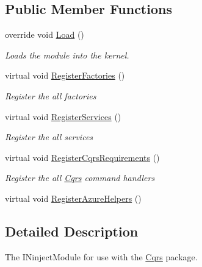 \subsection*{Public Member Functions}
\begin{DoxyCompactItemize}
\item 
override void \hyperlink{classCqrs_1_1Ninject_1_1Azure_1_1DocumentDb_1_1Configuration_1_1TestAzureDocumentDbModule_a88bb55534346355d3cf206a3bc8fa9c5}{Load} ()
\begin{DoxyCompactList}\small\item\em Loads the module into the kernel. \end{DoxyCompactList}\item 
virtual void \hyperlink{classCqrs_1_1Ninject_1_1Azure_1_1DocumentDb_1_1Configuration_1_1TestAzureDocumentDbModule_a903d7c2fc23d846f14024a8b83dd4a8f}{Register\+Factories} ()
\begin{DoxyCompactList}\small\item\em Register the all factories \end{DoxyCompactList}\item 
virtual void \hyperlink{classCqrs_1_1Ninject_1_1Azure_1_1DocumentDb_1_1Configuration_1_1TestAzureDocumentDbModule_aff24a0011b81f9db1a0509f712b791a4}{Register\+Services} ()
\begin{DoxyCompactList}\small\item\em Register the all services \end{DoxyCompactList}\item 
virtual void \hyperlink{classCqrs_1_1Ninject_1_1Azure_1_1DocumentDb_1_1Configuration_1_1TestAzureDocumentDbModule_a6e66e5334da9a6bea845f0abe05e2e76}{Register\+Cqrs\+Requirements} ()
\begin{DoxyCompactList}\small\item\em Register the all \hyperlink{namespaceCqrs}{Cqrs} command handlers \end{DoxyCompactList}\item 
virtual void \hyperlink{classCqrs_1_1Ninject_1_1Azure_1_1DocumentDb_1_1Configuration_1_1TestAzureDocumentDbModule_aae0cd0fea632ed53dcc430aaf972de22}{Register\+Azure\+Helpers} ()
\end{DoxyCompactItemize}


\subsection{Detailed Description}
The I\+Ninject\+Module for use with the \hyperlink{namespaceCqrs}{Cqrs} package. 



